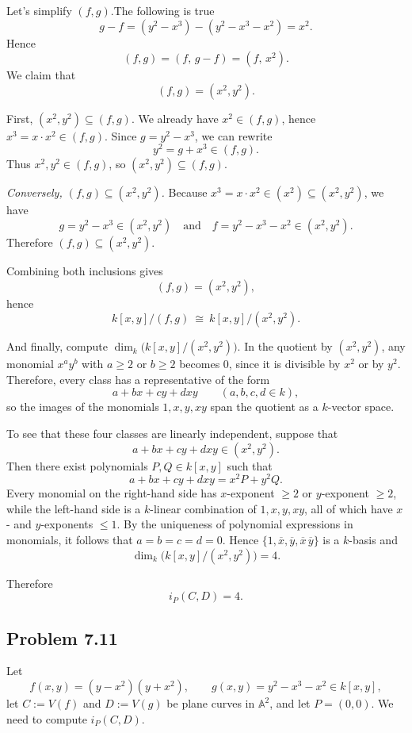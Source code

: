 \documentclass[a4paper,12pt,openany]{article}
\theoremstyle{plain}
\theoremstyle{definition}
\theoremstyle{remark}
\begin{document}
\medskip

Let's simplify $(f,g)$.The following is true
\[
g-f = (y^{2}-x^{3})-(y^{2}-x^{3}-x^{2})=x^{2}.
\]
Hence
\[
(f,g)=(f,\,g-f)=(f,\,x^{2}).
\]
We claim that
\[
(f,g)=(x^{2},y^{2}).
\]

First, $(x^{2},y^{2})\subseteq (f,g)$.
We already have $x^{2}\in(f,g)$, hence $x^{3}=x\cdot x^{2}\in(f,g)$.
Since $g=y^{2}-x^{3}$, we can rewrite
\[
y^{2}=g+x^{3}\in(f,g).
\]
Thus $x^{2},y^{2}\in(f,g)$, so $(x^{2},y^{2})\subseteq (f,g)$.

\emph{Conversely, $(f,g)\subseteq (x^{2},y^{2})$.}
Because $x^{3}=x\cdot x^{2}\in (x^{2})\subseteq (x^{2},y^{2})$, we have
\[
g=y^{2}-x^{3}\in (x^{2},y^{2})
\quad\text{and}\quad
f=y^{2}-x^{3}-x^{2}\in (x^{2},y^{2}).
\]
Therefore $(f,g)\subseteq (x^{2},y^{2})$.

Combining both inclusions gives
\[
(f,g)=(x^{2},y^{2}),
\]
hence
\[
k[x,y]/(f,g)\ \cong\ k[x,y]/(x^{2},y^{2}).
\]

\medskip

And finally, compute $\dim_{k}\bigl(k[x,y]/(x^{2},y^{2})\bigr)$.
In the quotient by $(x^{2},y^{2})$, any monomial $x^{a}y^{b}$ with $a\ge 2$ or $b\ge 2$ becomes $0$,
since it is divisible by $x^{2}$ or by $y^{2}$.
Therefore, every class has a representative of the form
\[
a+bx+cy+dxy \qquad (a,b,c,d\in k),
\]
so the images of the monomials $1,x,y,xy$ span the quotient as a $k$-vector space.

To see that these four classes are linearly independent, suppose that
\[
a+bx+cy+dxy \in (x^{2},y^{2}).
\]
Then there exist polynomials $P,Q\in k[x,y]$ such that
\[
a+bx+cy+dxy = x^{2}P + y^{2}Q.
\]
Every monomial on the right-hand side has $x$-exponent $\ge 2$ or $y$-exponent $\ge 2$,
while the left-hand side is a $k$-linear combination of $1,x,y,xy$, all of which have $x$- and $y$-exponents $\le 1$.
By the uniqueness of polynomial expressions in monomials, it follows that $a=b=c=d=0$.
Hence $\{1,\overline{x},\overline{y},\overline{x}\,\overline{y}\}$ is a $k$-basis and
\[
\dim_{k}\bigl(k[x,y]/(x^{2},y^{2})\bigr)=4.
\]

\medskip


Therefore
\[
i_{P}(C,D)=4.
\]


\subsection*{Problem 7.11}

Let
\[
f(x,y)=(y-x^{2})(y+x^{2}), \qquad g(x,y)=y^{2}-x^{3}-x^{2}\in k[x,y],
\]
let $C:=V(f)$ and $D:=V(g)$ be plane curves in $\mathbb{A}^{2}$, and let $P=(0,0)$.
We need to compute $i_{P}(C,D)$.
\end{document}
